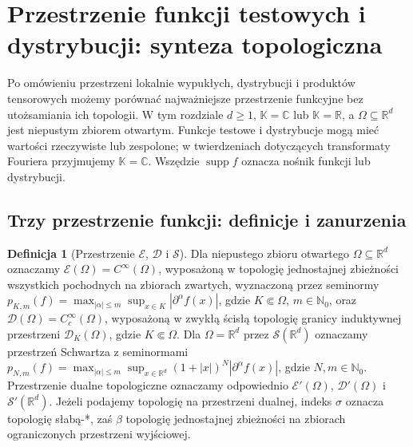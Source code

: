 \documentclass[11pt,a4paper]{article}
\numberwithin{equation}{section}
\theoremstyle{plain}
\theoremstyle{definition}
\newtheorem{definicja}[twierdzenie]{Definicja}
\theoremstyle{remark}
\newcommand{\R}{\mathbb R}
\newcommand{\C}{\mathbb C}
\newcommand{\N}{\mathbb N}
\newcommand{\K}{\mathbb K}
\DeclareMathOperator{\supp}{supp}
\begin{document}
\section{Przestrzenie funkcji testowych i dystrybucji: synteza topologiczna}
\label{sec:synteza25}

Po omówieniu przestrzeni lokalnie wypukłych, dystrybucji i produktów
 tensorowych możemy porównać najważniejsze przestrzenie funkcyjne bez
 utożsamiania ich topologii. W tym rozdziale $d\ge1$, $\K=\C$ lub
 $\K=\R$, a $\Omega\subseteq\R^d$ jest niepustym zbiorem otwartym.
 Funkcje testowe i dystrybucje mogą mieć wartości rzeczywiste lub
 zespolone; w twierdzeniach dotyczących transformaty Fouriera
 przyjmujemy $\K=\C$. Wszędzie $\supp f$ oznacza nośnik funkcji
 lub dystrybucji.

\subsection{Trzy przestrzenie funkcji: definicje i zanurzenia}

\begin{definicja}[Przestrzenie $\mathcal E$, $\mathcal D$ i $\mathcal S$]
\label{def:trzy-przestrzenie25}
Dla niepustego zbioru otwartego $\Omega\subseteq\R^d$ oznaczamy
$\mathcal E(\Omega)=C^\infty(\Omega)$, wyposażoną w topologię
jednostajnej zbieżności wszystkich pochodnych na zbiorach zwartych,
wyznaczoną przez seminormy
$p_{K,m}(f)=\max_{|\alpha|\le m}\sup_{x\in K}|\partial^\alpha f(x)|$,
gdzie $K\Subset\Omega$, $m\in\N_0$, oraz $\mathcal D(\Omega)=C_c^\infty(\Omega)$, wyposażoną w zwykłą
ścisłą topologię granicy induktywnej przestrzeni
$\mathcal D_K(\Omega)$, gdzie $K\Subset\Omega$.
Dla $\Omega=\R^d$ przez $\mathcal S(\R^d)$ oznaczamy przestrzeń
Schwartza z seminormami
$p_{N,m}(f)=\max_{|\alpha|\le m}\sup_{x\in\R^d}
(1+|x|)^N|\partial^\alpha f(x)|$, gdzie $N,m\in\N_0$.
Przestrzenie dualne topologiczne oznaczamy odpowiednio
$\mathcal E'(\Omega)$, $\mathcal D'(\Omega)$ i
$\mathcal S'(\R^d)$. Jeżeli podajemy topologię na przestrzeni
 dualnej, indeks $\sigma$ oznacza topologię słabą-*, zaś
 $\beta$ topologię jednostajnej zbieżności na zbiorach ograniczonych
 przestrzeni wyjściowej.
\end{definicja}
\end{document}

